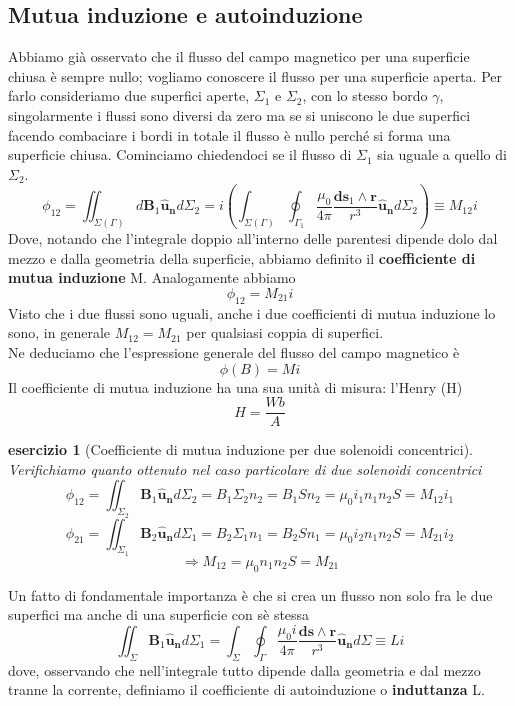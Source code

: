 \documentclass[10pt,a4paper]{article}
\newtheorem{esercizio}{esercizio}
\begin{document}
\subsection{Mutua induzione e autoinduzione}
Abbiamo già osservato che il flusso del campo magnetico per una superficie chiusa è sempre nullo; vogliamo conoscere il flusso per una superficie aperta. Per farlo consideriamo due superfici aperte, $\Sigma_1$ e $\Sigma_2$, con lo stesso bordo $\gamma$, singolarmente i flussi sono diversi da zero ma se si uniscono le due superfici facendo combaciare i bordi in totale il flusso è nullo perché si forma una superficie chiusa. Cominciamo chiedendoci se il flusso di $\Sigma_1$ sia uguale a quello di $\Sigma_2$.
\[\phi_{12} = \iint_{\Sigma(\Gamma)}d\mathbf{B}_1\mathbf{\hat{u}_n}d\Sigma_2= i\left(\int_{\Sigma(\Gamma)}\oint_{\Gamma_1}\frac{\mu_0 }{4\pi}\frac{\mathbf{ds}_1\wedge\mathbf{r}}{r^3}\mathbf{\hat{u}_n}d\Sigma_2\right)\equiv M_{12}i\]
Dove, notando che l'integrale doppio all'interno delle parentesi dipende dolo dal mezzo e dalla geometria della superficie, abbiamo definito il \textbf{coefficiente di mutua induzione} M.
Analogamente abbiamo
\[\phi_{12}= M_{21}i\]
Visto che i due flussi sono uguali, anche i due coefficienti di mutua induzione lo sono, in generale \(M_{12}=M_{21}\) per qualsiasi coppia di superfici.\\
Ne deduciamo che l'espressione generale del flusso del campo magnetico è
\[\phi(B) = M i\]
Il coefficiente di mutua induzione ha una sua unità di misura: l'Henry (H)
\[H = \frac{Wb}{A}\]
\begin{esercizio}[Coefficiente di mutua induzione per due solenoidi concentrici]
Verifichiamo quanto ottenuto nel caso particolare di due solenoidi concentrici
\[\phi_{12}=\iint_{\Sigma_2}\mathbf{B}_1\mathbf{\hat{u}_n}d\Sigma_2 = B_1\Sigma_2 n_2=B_1 S n_2 = \mu_0 i_1 n_1 n_2 S = M_{12}i_1\]
\[\phi_{21}=\iint_{\Sigma_1}\mathbf{B}_2\mathbf{\hat{u}_n}d\Sigma_1 = B_2\Sigma_1 n_1=B_2 S n_1 = \mu_0 i_2 n_1 n_2 S = M_{21}i_2\]
\[\Rightarrow M_{12}=\mu_0 n_1 n_2 S=M_{21}\]
\end{esercizio}
Un fatto di fondamentale importanza è che si crea un flusso non solo fra le due superfici ma anche di una superficie con sè stessa
\[\iint_{\Sigma}\mathbf{B}_1\mathbf{\hat{u}_n}d\Sigma_1 = \int_{\Sigma}\oint_{\Gamma}\frac{\mu_0 i }{4\pi}\frac{\mathbf{ds}\wedge\mathbf{r}}{r^3}\mathbf{\hat{u}_n}d\Sigma\equiv L i\]
dove, osservando che nell'integrale tutto dipende dalla geometria e dal mezzo tranne la corrente, definiamo il coefficiente di autoinduzione o \textbf{induttanza} L.
\end{document}

